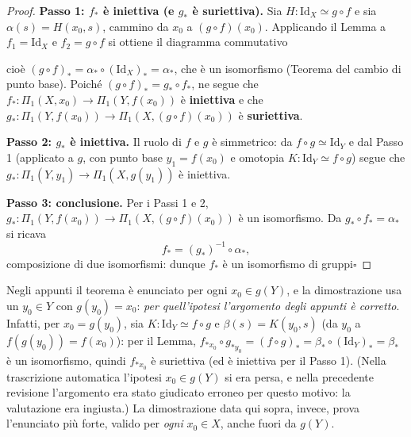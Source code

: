 \begin{proof}
\textbf{Passo 1: $f_*$ \`e iniettiva (e $g_*$ \`e suriettiva).} Sia $H: \mathrm{Id}_X \simeq g \circ f$ e sia $\alpha(s) = H(x_0, s)$, cammino da $x_0$ a $(g \circ f)(x_0)$. Applicando il Lemma a $f_1 = \mathrm{Id}_X$ e $f_2 = g \circ f$ si ottiene il diagramma commutativo

\begin{center}
\end{center}

cio\`e $(g \circ f)_* = \alpha_* \circ (\mathrm{Id}_X)_* = \alpha_*$, che \`e un isomorfismo (Teorema del cambio di punto base). Poich\'e $(g \circ f)_* = g_* \circ f_*$, ne segue che $f_*: \Pi_1(X, x_0) \to \Pi_1(Y, f(x_0))$ \`e \textbf{iniettiva} e che $g_*: \Pi_1(Y, f(x_0)) \to \Pi_1(X, (g\circ f)(x_0))$ \`e \textbf{suriettiva}.

\textbf{Passo 2: $g_*$ \`e iniettiva.} Il ruolo di $f$ e $g$ \`e simmetrico: da $f \circ g \simeq \mathrm{Id}_Y$ e dal Passo 1 (applicato a $g$, con punto base $y_1 = f(x_0)$ e omotopia $K: \mathrm{Id}_Y \simeq f \circ g$) segue che $g_*: \Pi_1(Y, y_1) \to \Pi_1(X, g(y_1))$ \`e iniettiva.

\textbf{Passo 3: conclusione.} Per i Passi 1 e 2, $g_*: \Pi_1(Y, f(x_0)) \to \Pi_1(X, (g\circ f)(x_0))$ \`e un isomorfismo. Da $g_* \circ f_* = \alpha_*$ si ricava
\[
f_* = (g_*)^{-1} \circ \alpha_* ,
\]
composizione di due isomorfismi: dunque $f_*$ \`e un isomorfismo di gruppi\hfill$\square$
\end{proof}

\begin{observacion}
Negli appunti il teorema \`e enunciato per ogni $x_0 \in g(Y)$, e la dimostrazione usa un $y_0 \in Y$ con $g(y_0) = x_0$: \emph{per quell'ipotesi l'argomento degli appunti \`e corretto}. Infatti, per $x_0 = g(y_0)$, sia $K: \mathrm{Id}_Y \simeq f \circ g$ e $\beta(s) = K(y_0, s)$ (da $y_0$ a $f(g(y_0)) = f(x_0)$): per il Lemma, $f_{*x_0} \circ g_{*y_0} = (f \circ g)_* = \beta_* \circ (\mathrm{Id}_Y)_* = \beta_*$ \`e un isomorfismo, quindi $f_{*x_0}$ \`e suriettiva (ed \`e iniettiva per il Passo 1). (Nella trascrizione automatica l'ipotesi $x_0 \in g(Y)$ si era persa, e nella precedente revisione l'argomento era stato giudicato erroneo per questo motivo: la valutazione era ingiusta.) La dimostrazione data qui sopra, invece, prova l'enunciato pi\`u forte, valido per \emph{ogni} $x_0 \in X$, anche fuori da $g(Y)$.
\end{observacion}


